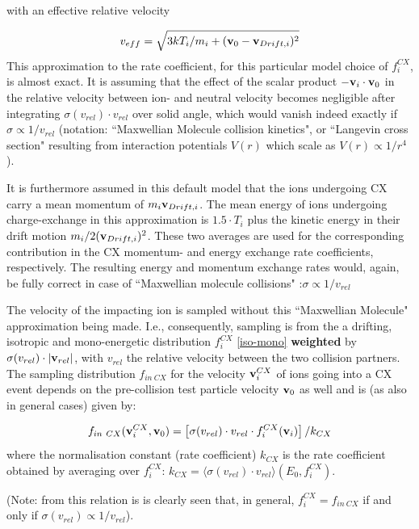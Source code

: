 with an effective relative velocity 

\begin{displaymath}
  v_{eff} = \sqrt{3 kT_i/m_i + (\mathbf{v}_0 - \mathbf{v}_{Drift,i})^2}
\end{displaymath}
This approximation to the rate coefficient, for this
particular model choice of $f_i^{CX}$, is almost exact.
It is assuming that the effect of the scalar product $-\mathbf{v}_i\cdot \mathbf{v}_0$ in the
relative velocity between ion- and neutral velocity becomes negligible after
integrating $\sigma(v_{rel}) \cdot v_{rel}$ over solid angle, which would
vanish indeed exactly if $\sigma \propto 1/v_{rel}$  (notation: ``Maxwellian
Molecule collision kinetics", or ``Langevin cross section" resulting from
interaction potentials $V(r)$ which scale as $V(r) \propto 1/r^4$).

It is furthermore assumed in this default model that the ions undergoing CX
carry a mean momentum of $m_i \mathbf{v}_{Drift,i}$.
The mean energy of ions undergoing charge-exchange in this approximation is
$1.5 \cdot T_i$  plus the kinetic energy in their drift motion $m_i/2
  (\mathbf{v}_{Drift,i})^2$.
These two averages are used for the corresponding contribution in the CX
momentum- and energy exchange rate coefficients, respectively.
The resulting energy and momentum exchange rates would, again, be fully correct
in case of ``Maxwellian molecule collisions" :$\sigma \propto 1/v_{rel}$

The velocity of the impacting ion is sampled without this ``Maxwellian
Molecule" approximation being made.
I.e., consequently, sampling is from the a drifting, isotropic and
mono-energetic distribution $f_i^{CX}$ \cref{iso-mono} \textbf{weighted} by
$\sigma(v_{rel}) \cdot |\mathbf{v}_{rel}|$, with $v_{rel}$ the relative velocity
between the two collision partners.
The sampling distribution $f_{in \ CX}$ for the velocity $\mathbf{v}_i^{CX}$ of ions
going into a CX event depends on the pre-collision test particle velocity
$\mathbf{v}_0$ as well and is (as also in general cases) given by:

\begin{equation}
  f_{in \ CX}
  (\mathbf{v}_i^{CX},\mathbf{v}_0)= \left[\sigma(v_{rel}) \cdot v_{rel} \cdot
  f_i^{CX}(\mathbf{v}_i)\right] /k_{CX}
\end{equation}
where the normalisation constant
(rate coefficient) $k_{CX}$ is the rate coefficient obtained by averaging over
$f_i^{CX}$:
$k_{CX} = \langle\sigma(v_{rel}) \cdot v_{rel}\rangle(E_0,f_i^{CX})$.

(Note: from this relation is is clearly seen that, in general, $f_i^{CX} =
  f_{in \ CX}$ if and only if $\sigma(v_{rel}) \propto 1/v_{rel}$).

